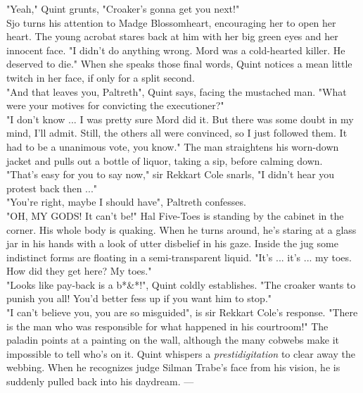 "Yeah," Quint grunts, "Croaker's gonna get you next!"\\

Sjo turns his attention to Madge Blossomheart, encouraging her to open her heart. The young acrobat stares back at him with her big green eyes and her innocent face. "I didn't do anything wrong. Mord was a cold-hearted killer. He deserved to die." When she speaks those final words, Quint notices a mean little twitch  in her face, if only for a split second.\\

"And that leaves you, Paltreth", Quint says, facing the mustached man. "What were your motives for convicting the executioner?"\\

"I don't know ... I was pretty sure Mord did it. But there was some doubt in my mind, I'll admit. Still, the others all were convinced, so I just followed them. It had to be a unanimous vote, you know." The man straightens his worn-down jacket and pulls out a bottle of liquor, taking a sip, before calming down.\\

"That's easy for you to say now," sir Rekkart Cole snarls, "I didn't hear you protest back then ..."\\

"You're right, maybe I should have", Paltreth confesses.\\

"OH, MY GODS! It can't be!" Hal Five-Toes is standing by the cabinet in the corner. His whole body is quaking. When he turns around, he's staring at a glass jar in his hands with a look of utter disbelief in his gaze. Inside the jug some indistinct forms are floating in a semi-transparent liquid. "It's ... it's ... my toes. How did they get here? My toes."\\

"Looks like pay-back is a b*\&*!", Quint coldly establishes. "The croaker wants to punish you all! You'd better fess up if you want him to stop."\\

"I can't believe you, you are so misguided", is sir Rekkart Cole's response. "There is the man who was responsible for what happened in his courtroom!" The paladin points at a painting on the wall, although the many cobwebs make it impossible to tell who's on it. Quint whispers a {\itshape prestidigitation} to clear away the webbing. When he recognizes judge Silman Trabe's face from his vision, he is suddenly pulled back into his daydream. ---\\

